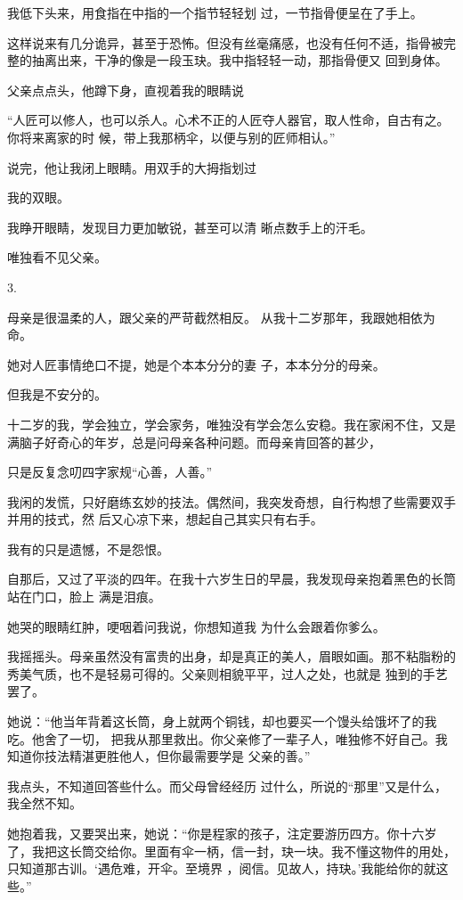 \documentclass{article}
\begin{document}
我低下头来，用食指在中指的一个指节轻轻划
过，一节指骨便呈在了手上。 

这样说来有几分诡异，甚至于恐怖。但没有丝毫痛感，也没有任何不适，指骨被完整的抽离出来，干净的像是一段玉玦。我中指轻轻一动，那指骨便又
回到身体。 


父亲点点头，他蹲下身，直视着我的眼睛说 

“人匠可以修人，也可以杀人。心术不正的人匠夺人器官，取人性命，自古有之。你将来离家的时
候，带上我那柄伞，以便与别的匠师相认。” 

说完，他让我闭上眼睛。用双手的大拇指划过
\newpage

我的双眼。 

我睁开眼睛，发现目力更加敏锐，甚至可以清
晰点数手上的汗毛。 


唯独看不见父亲。 


3. 

母亲是很温柔的人，跟父亲的严苛截然相反。
从我十二岁那年，我跟她相依为命。 

她对人匠事情绝口不提，她是个本本分分的妻
子，本本分分的母亲。 


但我是不安分的。 

十二岁的我，学会独立，学会家务，唯独没有学会怎么安稳。我在家闲不住，又是满脑子好奇心的年岁，总是问母亲各种问题。而母亲肯回答的甚少，

\newpage
只是反复念叨四字家规“心善，人善。” 

我闲的发慌，只好磨练玄妙的技法。偶然间，我突发奇想，自行构想了些需要双手并用的技式，然
后又心凉下来，想起自己其实只有右手。 


我有的只是遗憾，不是怨恨。 

自那后，又过了平淡的四年。在我十六岁生日的早晨，我发现母亲抱着黑色的长筒站在门口，脸上
满是泪痕。 

她哭的眼睛红肿，哽咽着问我说，你想知道我
为什么会跟着你爹么。 

我摇摇头。母亲虽然没有富贵的出身，却是真正的美人，眉眼如画。那不粘脂粉的秀美气质，也不是轻易可得的。父亲则相貌平平，过人之处，也就是
独到的手艺罢了。 

她说：“他当年背着这长筒，身上就两个铜钱，却也要买一个馒头给饿坏了的我吃。他舍了一切，
\newpage
把我从那里救出。你父亲修了一辈子人，唯独修不好自己。我知道你技法精湛更胜他人，但你最需要学是
父亲的善。” 

我点头，不知道回答些什么。而父母曾经经历
过什么，所说的“那里”又是什么，我全然不知。 

她抱着我，又要哭出来，她说：“你是程家的孩子，注定要游历四方。你十六岁了，我把这长筒交给你。里面有伞一柄，信一封，玦一块。我不懂这物件的用处，只知道那古训。‘遇危难，开伞。至境界
，阅信。见故人，持玦。’我能给你的就这些。” 
\end{document}

